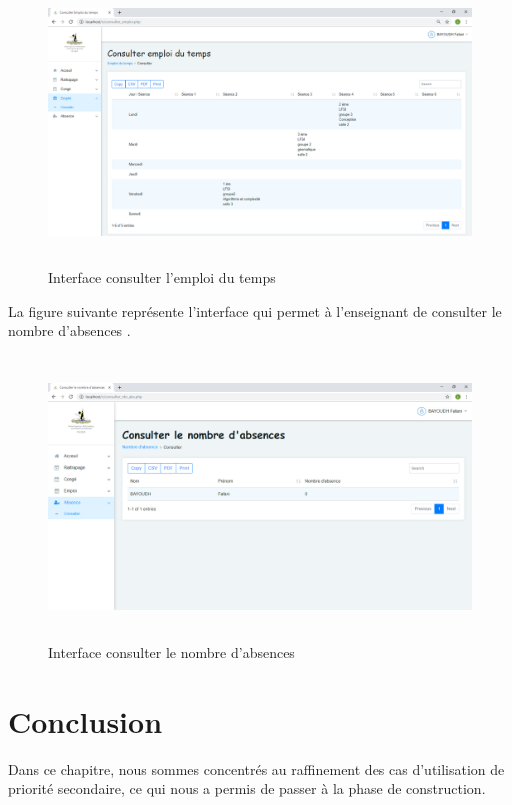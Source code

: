 \documentclass[12 pt]{report}
\begin{document}
\begin{figure}[h]
 \begin{center}
\includegraphics[width= 18 cm ,height=  7.5cm]{consulter_emploi.PNG}
\caption{Interface consulter l'emploi du temps }

\end{center}
\end{figure}
La figure suivante représente l'interface qui permet à l'enseignant de consulter le nombre d'absences .

\begin{figure}[h]
 \begin{center}
\includegraphics[width= 18 cm ,height=  7.5cm]{consulter_nbr_abs.PNG}
\caption{Interface consulter le nombre d'absences }

\end{center}
\end{figure}
\section*{Conclusion}  
Dans ce chapitre, nous sommes concentrés au raffinement des cas d'utilisation de priorité secondaire, ce qui nous a permis de passer à la phase de construction.
\end{document}
